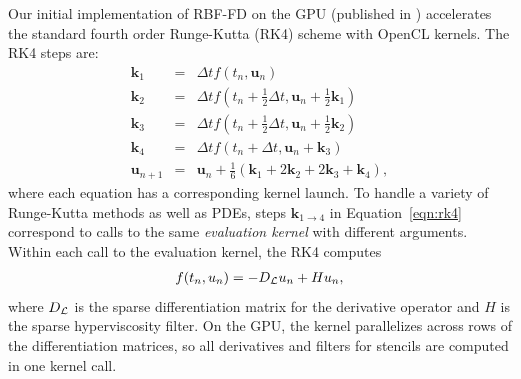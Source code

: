 \documentclass{report}
\begin{document}
Our initial implementation of RBF-FD on the GPU (published in \cite{BolligFlyerErlebacher2012}) accelerates the standard fourth order Runge-Kutta (RK4) scheme with OpenCL kernels. 
The RK4 steps are: 
\begin{eqnarray} 
\mathbf{k}_1 &=& \Delta t f(t_n, \mathbf{u}_n) \nonumber \\
\mathbf{k}_2 &=& \Delta t f(t_n+\frac{1}{2}\Delta t, \mathbf{u}_n + \frac{1}{2}\mathbf{k}_1) \nonumber \\
\mathbf{k}_3 &=& \Delta t f(t_n+\frac{1}{2}\Delta t, \mathbf{u}_n + \frac{1}{2}\mathbf{k}_2)  \label{eqn:rk4}\\
\mathbf{k}_4 &=& \Delta t f(t_n+\Delta t, \mathbf{u}_n + \mathbf{k}_3) \nonumber \\
\mathbf{u}_{n+1} &=& \mathbf{u}_{n} + \frac{1}{6}(\mathbf{k}_1 + 2\mathbf{k}_2 + 2\mathbf{k}_3 +\mathbf{k}_4), \nonumber
\end{eqnarray}
where each equation has a corresponding kernel launch. 
To handle a variety of Runge-Kutta methods as well as PDEs, steps $\mathbf{k}_{1\rightarrow4}$ in Equation~\ref{eqn:rk4} correspond to calls to the same \emph{evaluation kernel} with different arguments. Within each call to the evaluation kernel, the RK4 computes
\begin{align*}
f(t_n, u_n) = - D_{\mathcal{L}} u_n + H u_n, 
\end{align*}
where $D_{\mathcal{L}}$ is the sparse differentiation matrix for the derivative operator and $H$ is the sparse hyperviscosity filter. On the GPU, the kernel parallelizes across rows of the differentiation matrices, so all derivatives and filters for stencils are computed in one kernel call.

\end{document}
